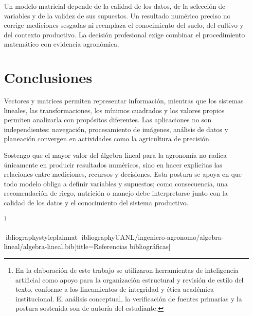 \documentclass[spanish,letterpaper,oneside]{article}
\begin{document}
Un modelo matricial depende de la calidad de los datos, de la selección de variables y de la validez de sus supuestos. Un resultado numérico preciso no corrige mediciones sesgadas ni reemplaza el conocimiento del suelo, del cultivo y del contexto productivo. La decisión profesional exige combinar el procedimiento matemático con evidencia agronómica.

\clearpage
\section{Conclusiones}
Vectores y matrices permiten representar información, mientras que los sistemas lineales, las transformaciones, los mínimos cuadrados y los valores propios permiten analizarla con propósitos diferentes. Las aplicaciones no son independientes: navegación, procesamiento de imágenes, análisis de datos y planeación convergen en actividades como la agricultura de precisión.

Sostengo que el mayor valor del álgebra lineal para la agronomía no radica únicamente en producir resultados numéricos, sino en hacer explícitas las relaciones entre mediciones, recursos y decisiones. Esta postura se apoya en que todo modelo obliga a definir variables y supuestos; como consecuencia, una recomendación de riego, nutrición o manejo debe interpretarse junto con la calidad de los datos y el conocimiento del sistema productivo.

\newpage\footnote{En la elaboración de este trabajo se utilizaron herramientas de inteligencia artificial como apoyo para la organización estructural y revisión de estilo del texto, conforme a los lineamientos de integridad y ética académica institucional. El análisis conceptual, la verificación de fuentes primarias y la postura sostenida son de autoría del estudiante.}

\clearpage
ibliographystyle{plainnat}
ibliography{UANL/ingeniero-agronomo/algebra-lineal/algebra-lineal.bib}[title={Referencias bibliográficas}]
\end{document}
